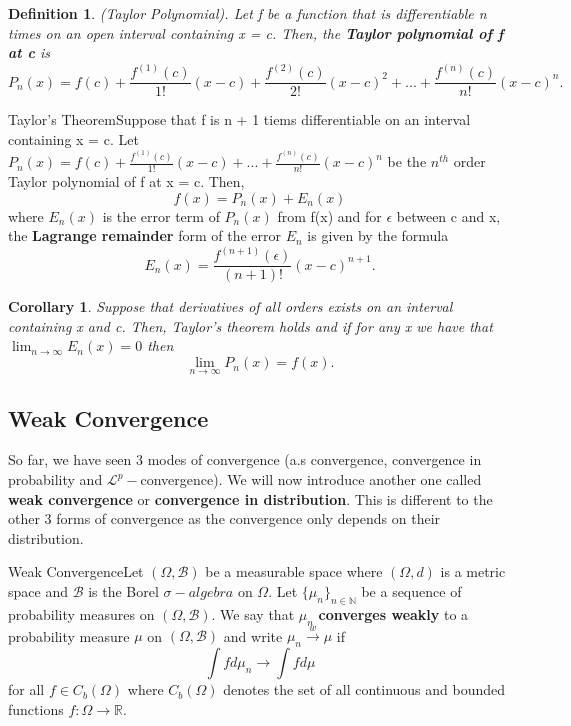 \documentclass[twoside]{article}
\newtheorem{corollary}[theorem]{Corollary}
\newtheorem{definition}[theorem]{Definition}
\newcommand{\borelsigmaalgebra}{\mathcal{B}}
\newcommand{\sa}{\sigma-algebra}
\begin{document}
\begin{definition}(Taylor Polynomial). Let f be a function that is differentiable n times on an open interval containing x = c. Then, the \textbf{Taylor polynomial of f at c} is 
$$
P_n(x) = f(c) + \frac{f^{(1)}(c)}{1!}(x - c) + \frac{f^{(2)}(c)}{2!}(x - c)^2 + ... + \frac{f^{(n)}(c)}{n!}(x - c)^{n}.
$$
\end{definition}


\begin{theorem_exam}{Taylor's Theorem}{}Suppose that f is n + 1 tiems differentiable on an interval containing x = c. Let $P_n(x) = f(c) + \frac{f^{(1)}(c)}{1!}(x - c) + ... + \frac{f^{(n)}(c)}{n!}(x - c)^{n}$ be the $n^{th}$ order Taylor polynomial of f at x = c. Then, 
$$
f(x) = P_n(x) + E_n(x)
$$
where $E_n(x)$ is the error term of $P_n(x)$ from f(x) and for $\epsilon$ between c and x, the \textbf{Lagrange remainder} form of the error $E_n$ is given by the formula 
$$
E_n(x) = \frac{f^{(n + 1)}(\epsilon)}{(n + 1)!}(x - c)^{n+1}.
$$
\end{theorem_exam}

\begin{corollary}Suppose that derivatives of all orders exists on an interval containing x and c. Then, Taylor's theorem holds and if for any x we have that $\lim_{n \rightarrow \infty}E_n(x) = 0$ then 
$$
\lim_{n \rightarrow \infty}P_n(x) = f(x).
$$
\end{corollary}


\subsection{Weak Convergence}
So far, we have seen 3 modes of convergence (a.s convergence, convergence in probability and $\mathcal{L}^p-$convergence). We will now introduce another one called \textbf{weak convergence} or \textbf{convergence in distribution}. This is different to the other 3 forms of convergence as the convergence only depends on their distribution.

\begin{definition_exam}{Weak Convergence}{}Let $(\Omega, \borelsigmaalgebra)$ be a measurable space where $(\Omega,d)$ is a metric space and $\borelsigmaalgebra$ is the Borel $\sa$ on $\Omega$. Let $\{\mu_n\}_{n \in \mathbb{N}}$ be a sequence of probability measures on $(\Omega, \borelsigmaalgebra)$. We say that $\mu_n$ \textbf{converges weakly} to a probability measure $\mu$ on $(\Omega, \borelsigmaalgebra)$ and write $\mu_n \xrightarrow{w} \mu$ if 
$$
\int fd\mu_n \rightarrow \int fd\mu
$$
for all $f \in C_b(\Omega)$ where $C_b(\Omega)$ denotes the set of all continuous and bounded functions $f: \Omega \rightarrow \mathbb{R}.$
\end{definition_exam}
\end{document}
